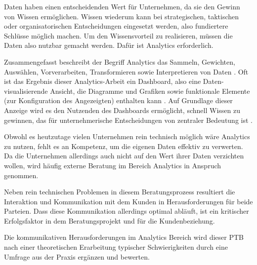 \documentclass[../main.tex]{subfiles}
\begin{document}
Daten haben einen entscheidenden Wert für Unternehmen, da sie den Gewinn von Wissen ermöglichen.
Wissen wiederum kann bei strategischen, taktischen oder organisatorischen Entscheidungen eingesetzt werden, also fundiertere Schlüsse möglich machen.
Um den Wissensvorteil zu realisieren, müssen die Daten also nutzbar gemacht werden. Dafür ist Analytics erforderlich.
\autocite{monino2021data, gupta2020digital, sarikaya2018we}

Zusammengefasst beschreibt der Begriff Analytics das Sammeln, Gewichten, Auswählen, Vorverarbeiten, Transformieren sowie Interpretieren von Daten \autocite{tsai2015big}.
Oft ist das Ergebnis dieser Analytics-Arbeit ein Dashboard, also eine Daten-visualisierende Ansicht, die Diagramme und Grafiken sowie funktionale Elemente (zur Konfiguration des Angezeigten) enthalten kann \autocite{sarikaya2018we}.
Auf Grundlage dieser Anzeige wird es den Nutzenden des Dashboards ermöglicht, schnell Wissen zu gewinnen, das für unternehmerische Entscheidungen von zentraler Bedeutung ist \autocite{sarikaya2018we}.

Obwohl es heutzutage vielen Unternehmen rein technisch möglich wäre Analytics zu nutzen, fehlt es an Kompetenz, um die eigenen Daten effektiv zu verwerten.
Da die Unternehmen allerdings auch nicht auf den Wert ihrer Daten verzichten wollen, wird häufig externe Beratung im Bereich Analytics in Anspruch genommen.
\autocite{gupta2020achieving,chen2012business}

Neben rein technischen Problemen in diesem Beratungsprozess resultiert die Interaktion und Kommunikation mit dem Kunden in Herausforderungen für beide Parteien.
Dass diese Kommunikation allerdings optimal abläuft, ist ein kritischer Erfolgsfaktor in dem Beratungsprojekt und für die Kundenbeziehung.
\autocite{appelbaum2005critical}

Die kommunikativen Herausforderungen im Analytics Bereich wird dieser PTB nach einer theoretischen Erarbeitung typischer Schwierigkeiten durch eine Umfrage aus der Praxis ergänzen und bewerten.
\end{document}
